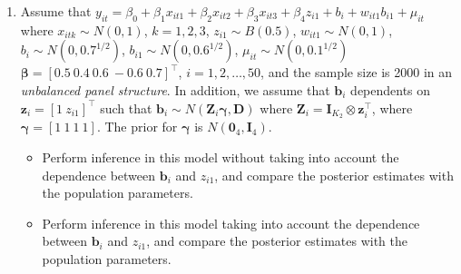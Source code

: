 \begin{enumerate}[leftmargin=*]
\item Assume that $y_{it}=\beta_0+\beta_1x_{it1}+\beta_2x_{it2}+\beta_3x_{it3}+\beta_4 z_{i1}+b_i+w_{it1}b_{i1}+\mu_{it}$ where $x_{itk}\sim N(0,1)$, $k=1,2,3$, $z_{i1}\sim B(0.5)$, $w_{it1}\sim N(0,1)$, $b_i\sim N(0, 0.7^{1/2})$, $b_{i1}\sim N(0, 0.6^{1/2})$, $\mu_{it}\sim N(0, 0.1^{1/2})$ $\bm{\beta}=[0.5 \ 0.4 \ 0.6 \ -0.6 \ 0.7]^{\top}$, $i=1,2,\dots,50$, and the sample size is 2000 in an \textit{unbalanced panel structure}. In addition, we assume that $\bm{b}_i$ dependents on $\bm{z}_i=[1 \ z_{i1}]^{\top}$ such that $\bm{b}_i\sim N(\bm{Z}_i\bm{\gamma},\bm{D})$ where $\bm{Z}_i=\bm{I}_{K_2}\otimes \bm{z}_i^{\top}$, where $\bm{\gamma}=[1 \ 1 \ 1 \ 1]$. The prior for $\bm{\gamma}$ is $N(\bm{0}_4,\bm{I}_4)$. 
	\begin{itemize}
	\item Perform inference in this model without taking into account the dependence between $\bm{b}_i$ and $z_{i1}$, and compare the posterior estimates with the population parameters.
	\item Perform inference in this model taking into account the dependence between $\bm{b}_i$ and $z_{i1}$, and compare the posterior estimates with the population parameters. 
\end{itemize}

\end{enumerate}